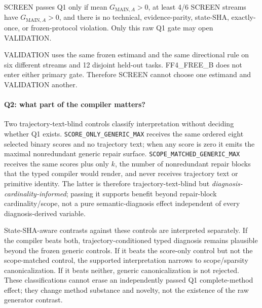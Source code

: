 SCREEN passes Q1 only if mean $G_{\mathrm{MAIN},A}>0$, at least 4/6 SCREEN streams have $G_{\mathrm{MAIN},A}>0$, and there is no technical, evidence-parity, state-SHA, exactly-once, or frozen-protocol violation. Only this raw Q1 gate may open VALIDATION.

VALIDATION uses the same frozen estimand and the same directional rule on six different streams and 12 disjoint held-out tasks. FF4\_FREE\_B does not enter either primary gate. Therefore SCREEN cannot choose one estimand and VALIDATION another.

\paragraph{Q2: what part of the compiler matters?}
Two trajectory-text-blind controls classify interpretation without deciding whether Q1 exists. \texttt{SCORE\_ONLY\_GENERIC\_MAX} receives the same ordered eight selected binary scores and no trajectory text; when any score is zero it emits the maximal nonredundant generic repair surface. \texttt{SCOPE\_MATCHED\_GENERIC\_MAX} receives the same scores plus only $k$, the number of nonredundant repair blocks that the typed compiler would render, and never receives trajectory text or primitive identity. The latter is therefore trajectory-text-blind but \emph{diagnosis-cardinality-informed}; passing it supports benefit beyond repair-block cardinality/scope, not a pure semantic-diagnosis effect independent of every diagnosis-derived variable.

State-SHA-aware contrasts against these controls are interpreted separately. If the compiler beats both, trajectory-conditioned typed diagnosis remains plausible beyond the frozen generic controls. If it beats the score-only control but not the scope-matched control, the supported interpretation narrows to scope/sparsity canonicalization. If it beats neither, generic canonicalization is not rejected. These classifications cannot erase an independently passed Q1 complete-method effect; they change method substance and novelty, not the existence of the raw generator contrast.

